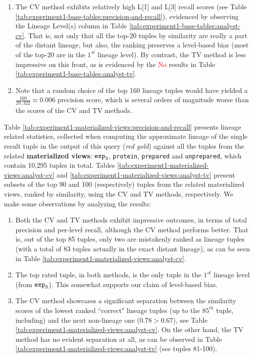 \begin{experiment-withrun}
\begin{enumerate}
    \item The CV method exhibits relatively high L[1] and L[3] recall scores (see Table \ref{tab:experiment1-base-tables:precision-and-recall}), evidenced by observing the Lineage Level(s) column in Table \ref{tab:experiment1-base-tables:analyst-cv}. That is, not only that all the top-20 tuples by similarity are really a part of the distant lineage, but also, the ranking preserves a level-based bias (most of the top-20 are in the $1^{st}$ lineage level). By contrast, the TV method is less impressive on this front, as is evidenced by the \textcolor{Red}{No} results in Table \ref{tab:experiment1-base-tables:analyst-tv}.
    \item Note that a random choice of the top 160 lineage tuples would have yielded a $\frac{160}{29,322} \approx 0.006$ precision score, which is several orders of magnitude worse than the scores of the CV and TV methods. 
\end{enumerate}



Table \ref{tab:experiment1-materialized-views:precision-and-recall} presents lineage related statistics, collected when computing the approximate lineage of the single result tuple in the output of this query (\textit{red gold}) against all the tuples from the related \textbf{materialized views}: $\texttt{exp}\sb\texttt{3}$, \texttt{protein}, \texttt{prepared} and \texttt{unprepared}, which contain 10,295 tuples in total. Tables \ref{tab:experiment1-materialized-views:analyst-cv} and \ref{tab:experiment1-materialized-views:analyst-tv} present subsets of the top 90 and 100 (respectively) tuples from the related materialized views, ranked by similarity, using the CV and TV methods, respectively. We make some observations by analyzing the results:
\begin{enumerate}
    \item Both the CV and TV methods exhibit impressive outcomes, in terms of total precision and per-level recall, although the CV method performs better. That is, out of the top 85 tuples, only two are mistakenly ranked as lineage tuples (with a total of 83 tuples actually in the exact distant lineage), as can be seen in Table \ref{tab:experiment1-materialized-views:analyst-cv}.
    \item The top rated tuple, in both methods, is the only tuple in the $1^{st}$ lineage level (from $\texttt{exp}\sb\texttt{3}$). This somewhat supports our claim of level-based bias.
    \item The CV method showcases a significant separation between the similarity scores of the lowest ranked ``correct" lineage tuples (up to the $85^{th}$ tuple, including) and the next non-lineage one ($0.78 > 0.67$), see Table \ref{tab:experiment1-materialized-views:analyst-cv}. On the other hand, the TV method has no evident separation at all, as can be observed in Table \ref{tab:experiment1-materialized-views:analyst-tv} (see tuples 81-100).
\end{enumerate}


\end{experiment-withrun}
